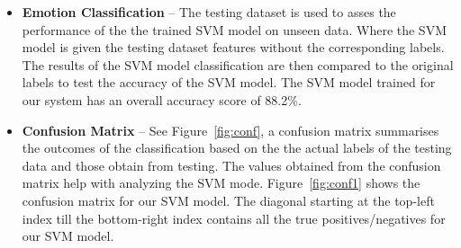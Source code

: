 \begin{itemize}
\item \textbf{Emotion Classification} -- The testing dataset is used to asses the performance of the the trained SVM model on unseen data. Where the SVM model is given the testing dataset features without the corresponding labels. The results of the SVM model classification are then compared to the original labels to test the accuracy of the SVM model. The SVM model trained for our system has an overall accuracy score of 88.2\%.\\
\item \textbf{Confusion Matrix} -- See Figure~\ref{fig:conf}, a confusion matrix summarises the outcomes of the classification based on the the actual labels of the testing data and those obtain from testing. The values obtained from the confusion matrix help with analyzing the SVM mode. Figure~\ref{fig:conf1} shows the confusion matrix for our SVM model. The diagonal starting at the top-left index till the bottom-right index contains all the true positives/negatives for our SVM model.


\end{itemize}
